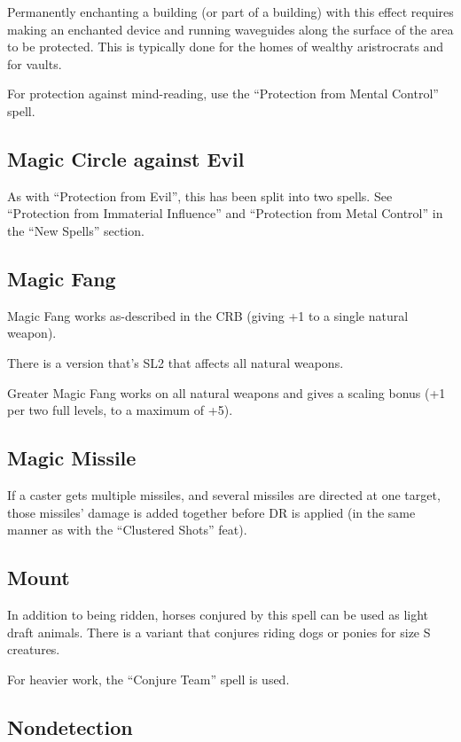 Permanently enchanting a building (or part of a building) with this effect
requires making an enchanted device and running waveguides along the surface
of the area to be protected. This is typically done for the homes of wealthy
aristrocrats and for vaults.

For protection against mind-reading, use the ``Protection from Mental
Control'' spell.
%

%
\subsection{Magic Circle against Evil}

As with ``Protection from Evil'', this has been split into two spells.
See ``Protection from Immaterial Influence'' and ``Protection from Metal
Control'' in the ``New Spells'' section.
%

%
\subsection{Magic Fang}

Magic Fang works as-described in the CRB (giving +1 to a single natural
weapon).

There is a version that's SL2 that affects all natural weapons.

Greater Magic Fang works on all natural weapons and gives a scaling bonus
(+1 per two full levels, to a maximum of +5).
%

%
\subsection{Magic Missile}

If a caster gets multiple missiles, and several missiles are directed at
one target, those missiles' damage is added together before DR is applied
(in the same manner as with the ``Clustered Shots'' feat).
%

%
\subsection{Mount}

In addition to being ridden, horses conjured by this spell can be used as
light draft animals. There is a variant that conjures riding dogs or ponies
for size S creatures.

For heavier work, the ``Conjure Team'' spell is used.
%

%
\subsection{Nondetection}

